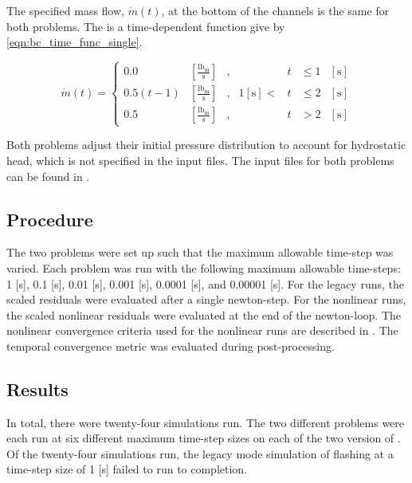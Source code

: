 The specified mass flow, $\dot{m}(t)$, at the bottom of the channels is the same for both problems. 
The is a time-dependent function give by \eqref{eqn:bc_time_func_single}.

\begin{equation}
\label{eqn:bc_time_func_single}
\dot{m}(t) = \left\{
\begin{array}{cclrcll}
 0.0           & [\frac{\text{lb}_{\text{m}}}{\text{s}}] & , &         & t & \leq 1 &[\text{s}] \\
 0.5 ( t - 1)  & [\frac{\text{lb}_{\text{m}}}{\text{s}}] & , & 1 [\text{s}] < & t & \leq 2 &[\text{s}] \\
 0.5           & [\frac{\text{lb}_{\text{m}}}{\text{s}}] & , &         & t & > 2    &[\text{s}]
\end{array}\right.
\end{equation}

Both problems adjust their initial pressure distribution to account for hydrostatic head, which is not specified in the input files.
The \cobra{} input files for both problems can be found in .

\subsection{Procedure}
\label{subsect:experiments_procedure}
The two problems were set up such that the maximum allowable time-step was varied.
Each problem was run with the following maximum allowable time-steps: 1 [s], 0.1 [s], 0.01 [s], 0.001 [s], 0.0001 [s], and 0.00001 [s]. 
For the legacy runs, the scaled residuals were evaluated after a single newton-step.
For the nonlinear runs, the scaled nonlinear residuals were evaluated at the end of the newton-loop.
The nonlinear convergence criteria used for the nonlinear runs are described in .
The temporal convergence metric was evaluated during post-processing.

\subsection{Results}
\label{subsect:results}

In total, there were twenty-four simulations run.
The two different problems were each run at six different maximum time-step sizes on each of the two version of \cobra.
Of the twenty-four simulations run, the legacy mode simulation of flashing at a time-step size of 1 [s] failed to run to completion.

